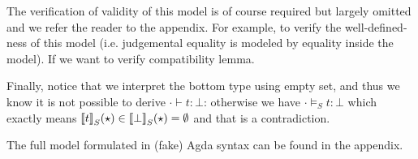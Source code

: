 The verification of validity of this model is of course required but largely omitted and we refer the reader to the appendix. For example, to verify the well-defined-ness of this model (i.e. judgemental equality is modeled by equality inside the model). If we want to verify compatibility lemma.


Finally, notice that we interpret the bottom type using empty set, and thus we know it is not possible to derive $\cdot \vdash t : \bot$: otherwise we have $\cdot \models_S t : \bot$ which exactly means ${{\llbracket {t} \rrbracket}_S}(\star) \in {{\llbracket {\bot} \rrbracket}_S}(\star) = \emptyset$ 
and that is a contradiction.

The full model formulated in (fake) Agda syntax can be found in the appendix.

